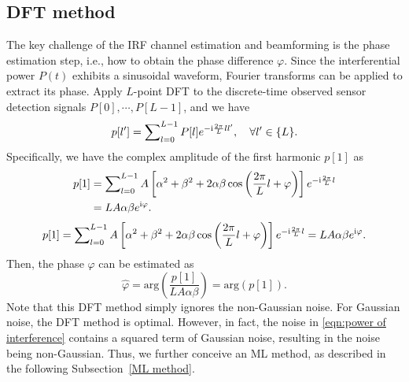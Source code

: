 \documentclass[journal,twocolumn]{IEEEtran}
\theoremstyle{nonumberplain}
\def \arg {\text{arg}}
\def \ri {{\rm i}}
\begin{document}
\subsection{DFT method}  \label{DFT method}
    The key challenge of the IRF channel estimation and beamforming is the phase estimation step, i.e., how to obtain the phase difference $\varphi$. Since the interferential power $P(t)$ exhibits a sinusoidal waveform, Fourier transforms can be applied to extract its phase. Apply $L$-point \ac{DFT} to the discrete-time  observed sensor detection signals $P[0],\cdots ,P[L-1]$, and we have
    \begin{equation}
        \label{DFT}
        p[l']=\sum\nolimits_{l=0}^{L-1}P[l]e^{-\ri\frac{2\pi}{L}ll'},\quad \forall l'\in \{L\}.
    \end{equation}
    Specifically, we have the complex amplitude of the first harmonic $p[1]$ as 
    \ifx\onecol\undefined
        \begin{equation} \label{DFT l=1}
            \begin{aligned}
                p[1]&=\sum\nolimits_{l=0}^{L-1}A\left[\alpha^{2}+\beta^{2}+2\alpha\beta\cos\left(\frac{2\pi}{L}l+\varphi\right)\right]e^{-\ri\frac{2\pi}{L}l}\\
                &=LA\alpha\beta  e^{\ri\varphi}.
            \end{aligned}
        \end{equation}
    \else 
        \begin{equation}
            \label{DFT l=1}
            p[1]=\sum\nolimits_{l=0}^{L-1}A\left[\alpha^{2}+\beta^{2}+2\alpha\beta\cos\left(\frac{2\pi}{L}l+\varphi\right)\right]e^{-{\ri}\frac{2\pi}{L}l}=LA\alpha\beta  e^{{\ri}\varphi}.
        \end{equation}
    \fi
    Then, the phase $\varphi$ can be estimated as
    \begin{equation}
        \label{LS estimate result}
        \hat{\varphi}=\arg\left(\frac{p[1]}{LA\alpha\beta}\right) = \arg\left(p[1]\right).
    \end{equation}
    Note that this DFT method simply ignores the non-Gaussian noise. For Gaussian noise, the DFT method is optimal. However, in fact, the noise in \eqref{eqn:power of interference} contains a squared term of Gaussian noise, resulting in the noise being non-Gaussian. Thus, we further conceive an ML method, as described in the following Subsection~\ref{ML method}. 
\end{document}
